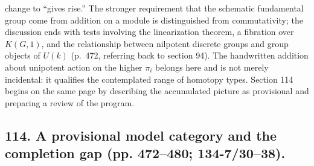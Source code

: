 \documentclass[10pt,oneside]{book}
\begin{document}
change to ``gives rise.'' The stronger requirement that the schematic fundamental group come from addition on a module is distinguished from commutativity; the discussion ends with tests involving the linearization theorem, a fibration over $K(G,1)$, and the relationship between nilpotent discrete groups and group objects of $U(k)$ (p.~472, referring back to section 94). The handwritten addition about unipotent action on the higher $\pi_i$ belongs here and is not merely incidental: it qualifies the contemplated range of homotopy types. Section 114 begins on the same page by describing the accumulated picture as provisional and preparing a review of the program.

\subsection*{114. A provisional model category and the completion gap (pp. 472--480; 134-7/30--38).}
\end{document}
